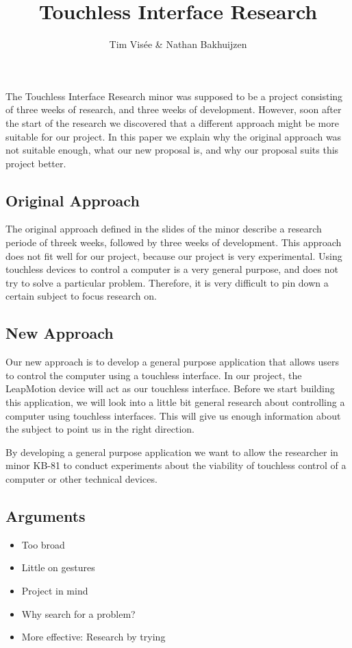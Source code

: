 \documentclass[a4paper]{article}
\title{Touchless Interface Research}
\author{Tim Visée \& Nathan Bakhuijzen}
\providecommand{\tightlist}{%
\setlength{\itemsep}{0pt}\setlength{\parskip}{0pt}}
\begin{document}

\maketitle

The Touchless Interface Research minor was supposed to be a project consisting
of three weeks of research, and three weeks of development. However, soon after
the start of the research we discovered that a different approach might be more
suitable for our project. In this paper we explain why the original approach was
not suitable enough, what our new proposal is, and why our proposal suits this
project better.

\subsection*{Original Approach}
The original approach defined in the slides of the minor describe a research
periode of threek weeks, followed by three weeks of development. This approach
does not fit well for our project, because our project is very experimental.
Using touchless devices to control a computer is a very general purpose, and
does not try to solve a particular problem. Therefore, it is very difficult to
pin down a certain subject to focus research on.

\subsection*{New Approach}
Our new approach is to develop a general purpose application that allows users
to control the computer using a touchless interface. In our project, the
LeapMotion device will act as our touchless interface. Before we start building
this application, we will look into a little bit general research about
controlling a computer using touchless interfaces. This will give us enough
information about the subject to point us in the right direction.

By developing a general purpose application we want to allow the researcher in
minor KB-81 to conduct experiments about the viability of touchless control of
a computer or other technical devices.

\subsection*{Arguments}
\begin{itemize}
  \tightlist
  \item Too broad
  \item Little on gestures
  \item Project in mind
  \item Why search for a problem?
  \item More effective: Research by trying
\end{itemize}
\end{document}
